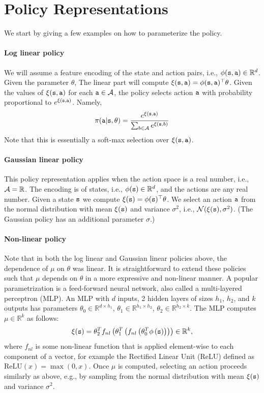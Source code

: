 \section{Policy Representations}
We start by giving a few examples on how to parameterize the policy.
\paragraph{Log linear policy} We will assume a feature encoding
of the state and action pairs, i.e., $\phi({\tt s},{\tt a})\in \mathbb{R}^{d}$. Given the parameter $\theta$, The linear part will compute $\xi({\tt s},{\tt a})=\phi({\tt s},{\tt a})^\top \theta$. Given the values of $\xi({\tt s},{\tt a})$ for each ${\tt a}\in \mathcal{A}$, the policy selects action ${\tt a}$ with probability proportional to
$e^{\xi({\tt s},{\tt a})}$. Namely,
\[
\pi({\tt a}|{\tt s},\theta)=
\frac{e^{\xi({\tt s},{\tt a})}}{\sum_{b\in
\mathcal{A}}e^{\xi({\tt s},b)}}
\]
Note that this is essentially a soft-max selection over $\xi({\tt s},{\tt a})$.

\paragraph{Gaussian linear policy} This policy representation applies when the action
space is a real number, i.e., $\mathcal{A}=\mathbb{R}$. The encoding is of states, i.e., $\phi({\tt s})\in \mathbb{R}^{d}$, and the actions are any real number. Given a state ${\tt s}$
we compute $\xi({\tt s})=\phi({\tt s})^\top\theta$. We select an
action ${\tt a}$ from the normal distribution with mean
$\xi({\tt s})$ and variance $\sigma^2$, i.e.,
$\mathcal{N}(\xi({\tt s}),\sigma^2)$. (The Gaussian policy has an additional
parameter $\sigma$.)

\paragraph{Non-linear policy} Note that in both the log linear and Gaussian linear policies above, the dependence of $\mu$ on $\theta$ was linear. It is straightforward to extend these policies such that $\mu$ depends on $\theta$ in a more expressive and non-linear manner. A popular parametrization is a feed-forward neural network, also called a multi-layered perceptron (MLP). An MLP with $d$ inputs, 2 hidden layers of sizes $h_1$, $h_2$, and $k$ outputs has parameters $\theta_0 \in \mathbb{R}^{d \times h_1}$, $\theta_1 \in \mathbb{R}^{h_1 \times h_2}$, $\theta_2 \in \mathbb{R}^{h_2 \times k}$. The MLP computes $\mu\in \mathbb{R}^{k}$ as follows:
\begin{equation*}
    \xi({\tt s}) = \theta_2^T f_{nl}\left(\theta_1^T\left( f_{nl}\left(\theta_0^T \phi\left({\tt s} \right)\right)\right)\right) \in \mathbb{R}^{k},
\end{equation*}
where $f_{nl}$ is some non-linear function that is applied element-wise to each component of a vector, for example the Rectified Linear Unit (ReLU) defined as $\text{ReLU}(x) = \max(0, x)$. Once $\mu$ is computed, selecting an
action proceeds similarly as above, e.g., by sampling from the normal distribution with mean
$\xi({\tt s})$ and variance $\sigma^2$.

